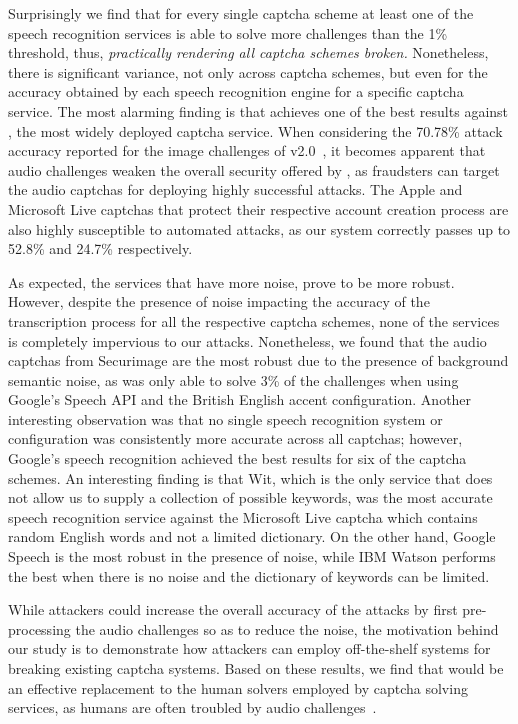 Surprisingly we find that for every single captcha scheme at least
one of the speech recognition services is able to solve more challenges than the 1\% threshold, thus, \emph{practically 
rendering all captcha schemes broken.} Nonetheless, there is significant variance, not only across captcha schemes, but
even for the accuracy obtained by each speech recognition engine for a specific captcha service.
The most alarming finding is that \system achieves one of the best results against \re, the most widely deployed captcha service.
When considering the 70.78\% attack accuracy reported for the image challenges of v2.0~\cite{sivakorn:eurosp16},
it becomes apparent that audio challenges weaken the overall security offered by \re, as fraudsters can target the
audio captchas for deploying highly successful attacks. 
The Apple and Microsoft Live captchas that protect their respective account creation process are also highly susceptible to 
automated attacks, as our system correctly passes up to 52.8\% and 24.7\% respectively.

As expected, the services that have more noise, prove to be more robust.
However, despite the presence of noise impacting the accuracy of the transcription process for all the respective captcha schemes,
none of the services is completely impervious to our attacks. Nonetheless, we
found that the audio captchas from Securimage are the most robust due to the presence of background semantic noise,
as \system was only able to solve 3\% of the challenges when using Google's Speech API and the British English accent
configuration. Another interesting observation was that no single speech recognition system or configuration
was consistently more accurate across all captchas; however, Google's speech recognition achieved the best
results for six of the captcha schemes. An interesting finding is that Wit, which is the only service that does not 
allow us to supply a collection of possible keywords, was the most accurate speech recognition service against the 
Microsoft Live captcha which contains random English words and not a limited dictionary. On the other hand, Google Speech
is the most robust in the presence of noise, while IBM Watson performs the best when there is no noise and the dictionary
of keywords can be limited.

While attackers could increase the overall accuracy of the attacks
by first pre-processing the audio challenges so as to reduce the noise, the motivation behind our study is to 
demonstrate how attackers can employ off-the-shelf systems for breaking existing captcha systems.
Based on these results, we find that \system would be an effective replacement to the human solvers employed by
captcha solving services, as humans are often troubled by audio challenges~\cite{captchas-are-hard}.


